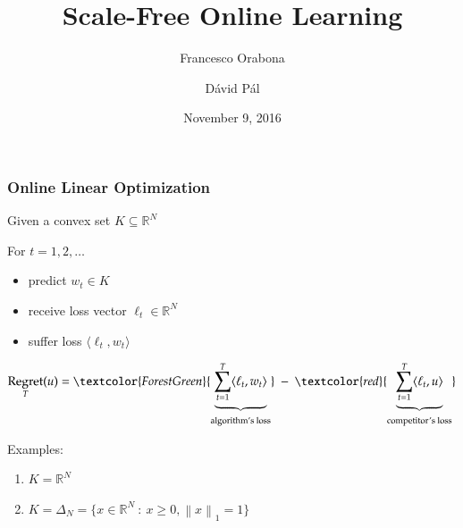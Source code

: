 \documentclass[usenames,dvipsnames]{beamer}
\title{Scale-Free Online Learning}
\date{November 9, 2016}
\author{Francesco Orabona \and D\'avid P\'al}
\institute{Stony Brook University \\ \& \\ Yahoo Research, New York}
\DeclareMathOperator{\Regret}{Regret}
\newcommand{\R}{\mathbb{R}}
\newcommand{\norm}[1]{\left\|#1\right\|}
\begin{document}
\begin{frame}
\maketitle
\end{frame}

\begin{frame}
\frametitle{Online Linear Optimization}

Given a convex set $K \subseteq \R^N$

\vspace{0.3cm}

For $t=1,2,\dots$
\begin{itemize}
\item predict $w_t \in K$
\item receive loss vector $\ell_t \in \R^N$
\item suffer loss $\langle \ell_t, w_t \rangle$
\end{itemize}

\pause
\vspace{0.3cm}
$$
\Regret_T(u) = \textcolor{ForestGreen}{\underbrace{\sum_{t=1}^T \langle \ell_t, w_t \rangle}_{\text{algorithm's loss}}} \ - \ \textcolor{red}{\underbrace{\sum_{t=1}^T \langle \ell_t, u \rangle}_{\text{competitor's loss}}}
$$

\pause
\vspace{0.3cm}

Examples:
\begin{enumerate}
\item $K = \R^N$
\item $K = \Delta_N = \{ x \in \R^N ~:~ x \ge 0, \norm{x}_1 = 1 \}$
\end{enumerate}

\end{frame}
\end{document}
